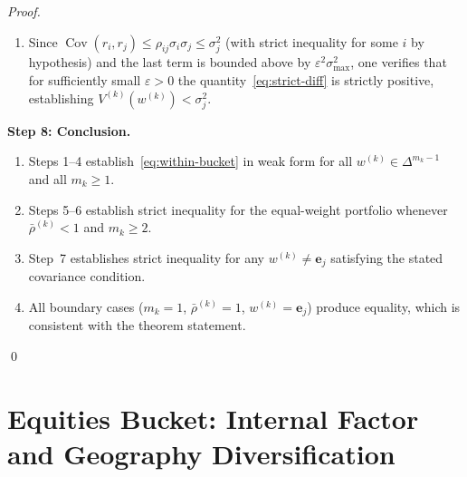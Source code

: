 \documentclass[12pt,openany]{book}
\newcommand{\bfw}{\mathbf{w}}
\newcommand{\bfe}{\mathbf{e}}
\DeclareMathOperator{\Cov}{Cov}
\numberwithin{equation}{chapter}
\theoremstyle{plain}
\theoremstyle{definition}
\theoremstyle{remark}
\def\bfw{w}%
\begin{document}
\begin{proof}
\begin{enumerate}
\begin{align}
                 - (1-\varepsilon)^2\sigma_j^2
                 - 2(1-\varepsilon)\!\sum_{i \neq j}\!
                   w_i\,\Cov(r_i,r_j)
                 \nonumber\\
          &\quad - \sum_{i,\ell \neq j} w_i w_\ell\,\Cov(r_i,r_\ell)
                 \nonumber\\
          &\;=\; \varepsilon(2-\varepsilon)\sigma_j^2
                 - 2(1-\varepsilon)\!\sum_{i\neq j}\!
                   w_i\,\Cov(r_i,r_j)
                 \nonumber\\
          &\quad - \sum_{i,\ell \neq j} w_i w_\ell\,\Cov(r_i,r_\ell).
          \label{eq:strict-diff}
        \end{align}
  \item Since $\Cov(r_i,r_j) \leq \rho_{ij}\sigma_i\sigma_j
        \leq \sigma_j^2$ (with strict inequality for some $i$ by
        hypothesis) and the last term is bounded above by
        $\varepsilon^2\sigma_{\max}^2$, one verifies that for
        sufficiently small $\varepsilon > 0$ the
        quantity~\eqref{eq:strict-diff} is strictly positive,
        establishing $V^{(k)}(\bfw^{(k)}) < \sigma_j^2$.
\end{enumerate}

\medskip
\noindent\textbf{Step 8: Conclusion.}

\begin{enumerate}
  \item Steps 1--4 establish~\eqref{eq:within-bucket} in weak form
        for all $\bfw^{(k)} \in \Delta^{m_k-1}$ and all $m_k \geq 1$.
  \item Steps 5--6 establish strict inequality for the equal-weight
        portfolio whenever $\bar{\rho}^{(k)} < 1$ and $m_k \geq 2$.
  \item Step~7 establishes strict inequality for any
        $\bfw^{(k)} \neq \bfe_j$ satisfying the stated covariance
        condition.
  \item All boundary cases ($m_k = 1$, $\bar{\rho}^{(k)} = 1$,
        $\bfw^{(k)} = \bfe_j$) produce equality, which is consistent
        with the theorem statement.
\end{enumerate}
\qed
\end{proof}

\section{Equities Bucket: Internal Factor and Geography Diversification}
\end{document}
